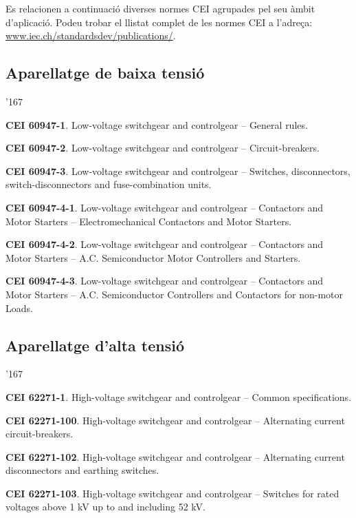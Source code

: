 Es relacionen a continuaci\'{o} diverses normes \textsf{CEI} agrupades pel seu \`{a}mbit d'aplicaci\'{o}. Podeu trobar el llistat complet de les normes \textsf{CEI} a l'adre\c{c}a: \href{http://www.iec.ch/standardsdev/publications/}{www.iec.ch/standardsdev/publications/}.

\subsection*{Aparellatge de baixa tensi\'{o}}
\begin{dinglist}{'167}
    \item \textbf{CEI 60947-1}. Low-voltage switchgear and controlgear -- General rules.
    \item \textbf{CEI 60947-2}. Low-voltage switchgear and controlgear -- Circuit-breakers.
    \item \textbf{CEI 60947-3}. Low-voltage switchgear and controlgear -- Switches, disconnectors, switch-dis\-con\-nec\-tors and fuse-combination units.
    \item \textbf{CEI 60947-4-1}. Low-voltage switchgear and controlgear -- Contactors and Motor Starters -- Electromechanical Contactors and Motor Starters.
    \item \textbf{CEI 60947-4-2}. Low-voltage switchgear and controlgear -- Contactors and Motor Starters -- A.C. Semiconductor Motor Controllers and Starters.
    \item \textbf{CEI 60947-4-3}. Low-voltage switchgear and controlgear -- Contactors and Motor Starters -- A.C. Semiconductor Controllers and Contactors for non-motor Loads.
\end{dinglist}

\subsection*{Aparellatge d'alta tensi\'{o}}
\begin{dinglist}{'167}
    \item \textbf{CEI 62271-1}. High-voltage switchgear and controlgear -- Common specifications.
    \item \textbf{CEI 62271-100}. High-voltage switchgear and controlgear -- Alternating current circuit-breakers.
    \item \textbf{CEI 62271-102}. High-voltage switchgear and controlgear -- Alternating current disconnectors and earthing switches.
    \item \textbf{CEI 62271-103}. High-voltage switchgear and controlgear -- Switches for rated voltages above 1 kV up to and including 52 kV.
\end{dinglist}

